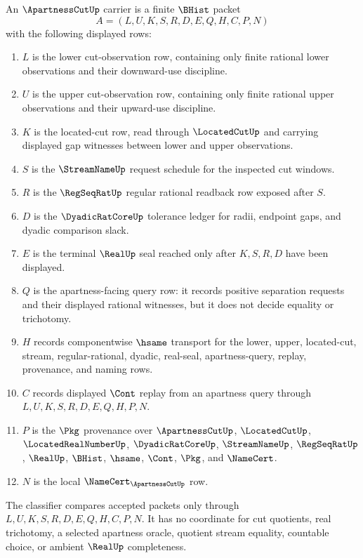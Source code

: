 \begin{definition}
\label{def:apartness-cut-carrier}
An $\ApartnessCutUp$ carrier is a finite $\BHist$ packet
$$
A=(L,U,K,S,R,D,E,Q,H,C,P,N)
$$
with the following displayed rows:
\begin{enumerate}
\item $L$ is the lower cut-observation row, containing only finite rational lower observations and their downward-use discipline.
\item $U$ is the upper cut-observation row, containing only finite rational upper observations and their upward-use discipline.
\item $K$ is the located-cut row, read through $\LocatedCutUp$ and carrying displayed gap witnesses between lower and upper observations.
\item $S$ is the $\StreamNameUp$ request schedule for the inspected cut windows.
\item $R$ is the $\RegSeqRatUp$ regular rational readback row exposed after $S$.
\item $D$ is the $\DyadicRatCoreUp$ tolerance ledger for radii, endpoint gaps, and dyadic comparison slack.
\item $E$ is the terminal $\RealUp$ seal reached only after $K,S,R,D$ have been displayed.
\item $Q$ is the apartness-facing query row: it records positive separation requests and their displayed rational witnesses, but it does not decide equality or trichotomy.
\item $H$ records componentwise $\hsame$ transport for the lower, upper, located-cut, stream, regular-rational, dyadic, real-seal, apartness-query, replay, provenance, and naming rows.
\item $C$ records displayed $\Cont$ replay from an apartness query through $L,U,K,S,R,D,E,Q,H,P,N$.
\item $P$ is the $\Pkg$ provenance over $\ApartnessCutUp$, $\LocatedCutUp$, $\LocatedRealNumberUp$, $\DyadicRatCoreUp$, $\StreamNameUp$, $\RegSeqRatUp$, $\RealUp$, $\BHist$, $\hsame$, $\Cont$, $\Pkg$, and $\NameCert$.
\item $N$ is the local $\NameCert_{\ApartnessCutUp}$ row.
\end{enumerate}
The classifier compares accepted packets only through $L,U,K,S,R,D,E,Q,H,C,P,N$. It has no coordinate for cut quotients, real trichotomy, a selected apartness oracle, quotient stream equality, countable choice, or ambient $\RealUp$ completeness.
\end{definition}

